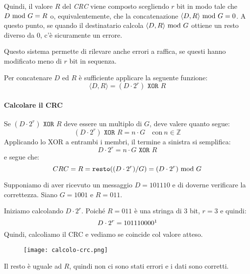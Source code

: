 Quindi, il valore $R$ del \emph{CRC} viene composto scegliendo $r$ bit in modo tale che
$D\ \mathrm{mod}\ G=R$ o, equivalentemente, che la concatenazione $\langle D,R\rangle\ \mathrm{mod}\ G=0$. A
questo punto, se quando il destinatario calcola $\langle D,R\rangle\ \mathrm{mod}\ G$ ottiene un
resto diverso da 0, c'è sicuramente un errore.

Questo sistema permette di rilevare anche errori a raffica, se questi hanno modificato meno
di $r$ bit in sequenza.

\begin{note}
    Per concatenare $D$ ed $R$ è sufficiente applicare la seguente funzione:
    \[\langle D,R\rangle=(D\cdot2^r)\texttt{ XOR }R\]
\end{note}

\paragraph{Calcolare il CRC}
Se $(D\cdot2^r)\texttt{ XOR }R$ deve essere un multiplo di $G$, deve valere
quanto segue:
\[(D\cdot2^r)\texttt{ XOR }R=n\cdot G\quad\text{con}\ n\in\mathbb{Z}\]
Applicando lo XOR a entrambi i membri, il termine a sinistra si semplifica:
\[D\cdot2^r=n\cdot G\texttt{ XOR }R\]
e segue che:
\[CRC=R=\texttt{resto}((D\cdot2^r)/G)=(D\cdot2^r)\ \mathrm{mod}\ G\]

\begin{eg}
    Supponiamo di aver ricevuto un messaggio $D=101110$ e di doverne verificare
    la correttezza. Siano $G=1001$ e $R=011$.

    \bigskip\noindent
    Iniziamo calcolando $D\cdot 2^r$. Poiché $R=011$ è una stringa di 3 bit,
    $r=3$ e quindi:
    \[D\cdot 2^r=101110000\footnotemark\]
    Quindi, calcoliamo il CRC e vediamo se coincide col valore atteso.
    \begin{figure}[h!]
        \centering
        \texttt{[image: calcolo-crc.png]}
    \end{figure}

    \noindent
    Il resto è uguale ad $R$, quindi non ci sono stati errori e i dati sono
    corretti.
\end{eg}

